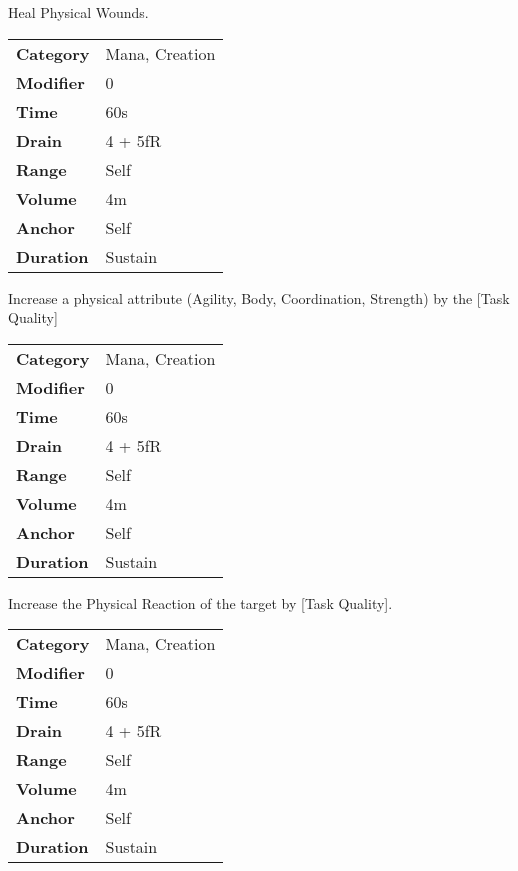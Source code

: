 \hfil

Heal Physical Wounds.


\begin{tabular}{ll}
    \textbf{Category} & Mana, Creation \\
    \textbf{Modifier} & 0              \\
    \textbf{Time}     & 60s            \\
    \textbf{Drain}    & 4 + 5fR        \\
    \textbf{Range}    & Self           \\
    \textbf{Volume}   & 4m             \\
    \textbf{Anchor}   & Self           \\
    \textbf{Duration} & Sustain        \\
\end{tabular}

\hfil

Increase a physical attribute (Agility, Body, Coordination,
Strength) by the [Task Quality]


\begin{tabular}{ll}
    \textbf{Category} & Mana, Creation \\
    \textbf{Modifier} & 0              \\
    \textbf{Time}     & 60s            \\
    \textbf{Drain}    & 4 + 5fR        \\
    \textbf{Range}    & Self           \\
    \textbf{Volume}   & 4m             \\
    \textbf{Anchor}   & Self           \\
    \textbf{Duration} & Sustain        \\
\end{tabular}

\hfil

Increase the Physical Reaction of the target by [Task
        Quality].


\begin{tabular}{ll}
    \textbf{Category} & Mana, Creation \\
    \textbf{Modifier} & 0              \\
    \textbf{Time}     & 60s            \\
    \textbf{Drain}    & 4 + 5fR        \\
    \textbf{Range}    & Self           \\
    \textbf{Volume}   & 4m             \\
    \textbf{Anchor}   & Self           \\
    \textbf{Duration} & Sustain        \\
\end{tabular}

